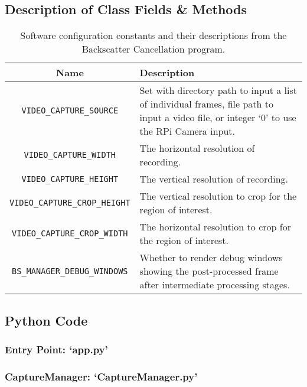 \subsection{Description of Class Fields \& Methods}
\label{sys_tbls}
\begin{table}[H]
    \centering
    \begin{tabularx}{\linewidth}{c | X}
        Name    &   Description\\
        \hline
        \hline
        \texttt{VIDEO\_CAPTURE\_SOURCE} & Set with directory path to input a list of individual frames, file path to input a video file, or integer `0' to use the RPi Camera input.\\
        \hline
        \texttt{VIDEO\_CAPTURE\_WIDTH} & The horizontal resolution of recording.\\
        \hline
        \texttt{VIDEO\_CAPTURE\_HEIGHT} & The vertical resolution of recording.\\
        \hline
        \texttt{VIDEO\_CAPTURE\_CROP\_HEIGHT} &  The vertical resolution to crop for the region of interest.\\
        \hline
        \texttt{VIDEO\_CAPTURE\_CROP\_WIDTH} &  The horizontal resolution to crop for the region of interest.\\
        \hline
        \texttt{BS\_MANAGER\_DEBUG\_WINDOWS} & Whether to render debug windows showing the post-processed frame after intermediate processing stages.\\
        \hline
    \end{tabularx}
    \caption{Software configuration constants and their descriptions from the Backscatter Cancellation program.}
    \label{table:sysparams}
\end{table}

\subsection{Python Code}
\label{sys_code}
\subsubsection{Entry Point: `app.py'}



\subsubsection{CaptureManager: `CaptureManager.py'}

